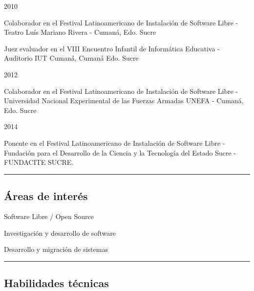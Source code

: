 \documentclass[10pt,letterpaper]{article}
\newenvironment{indentsection}[1]%
{\begin{list}{}%
	{\setlength{\leftmargin}{#1}}%
	\item[]%
}
{\end{list}}
\begin{document}
\begin{indentsection}{\parindent}
  \item {\large 2010}
    \begin{itemize*}
	    \item Colaborador en el Festival Latinoamericano de Instalación de Software Libre - Teatro Luís Mariano Rivera - Cumaná, Edo. Sucre
	    \item Juez evaluador en el VIII Encuentro Infantil de Informática Educativa - Auditorio IUT Cumaná, Cumaná Edo. Sucre
    \end{itemize*}
    \item {\large 2012}
    \begin{itemize*}
	    \item Colaborador en el Festival Latinoamericano de Instalación de Software Libre - Universidad Nacional Experimental de las Fuerzas Armadas UNEFA - Cumaná, Edo. Sucre
    \end{itemize*}
    \item {\large 2014}
    \begin{itemize*}
            \item Ponente en el Festival Latinoamericano de Instalación de Software Libre - Fundación para el Desarrollo de la Ciencia y la Tecnología del Estado Sucre - FUNDACITE SUCRE.
    \end{itemize*}
\end{indentsection}

\hrule
\vspace{-0.4em}
\subsection*{Áreas de interés}

\begin{indentsection}{\parindent}
\begin{itemize*}
  \item Software Libre / Open Source
  \item Investigación y desarrollo de software
  \item Desarrollo y migración de sistemas
\end{itemize*}
\end{indentsection}

\hrule
\vspace{-0.4em}
\subsection*{Habilidades técnicas}
\end{document}
